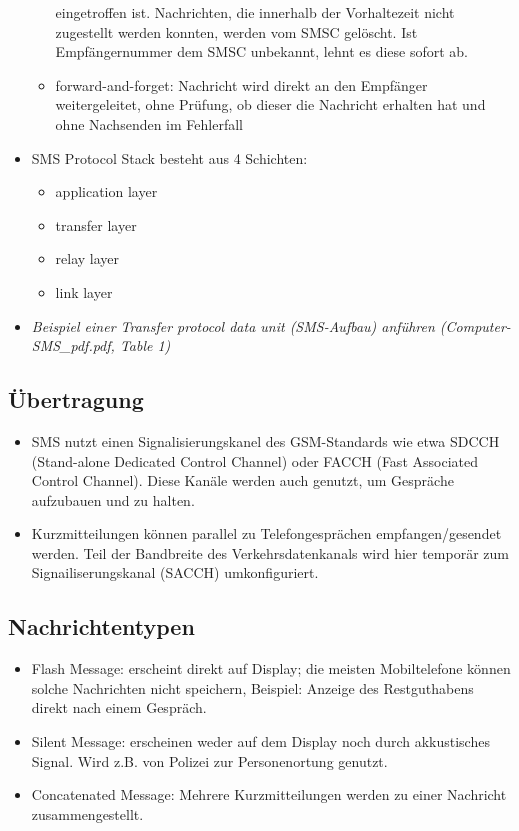 \documentclass[german,12pt,a4paper]{article}
\begin{document}
\begin{itemize}
\begin{itemize}
				eingetroffen ist. Nachrichten, die innerhalb der Vorhaltezeit nicht zugestellt werden 
				konnten, werden vom SMSC gelöscht. Ist Empfängernummer dem SMSC unbekannt, lehnt es diese sofort ab.
			\item forward-and-forget: Nachricht wird direkt an den Empfänger weitergeleitet, ohne Prüfung, ob 
				dieser die Nachricht erhalten hat und ohne Nachsenden im Fehlerfall
		\end{itemize}	
	\item SMS Protocol Stack besteht aus 4 Schichten:
		\begin{itemize}
			\item application layer
			\item transfer layer
			\item relay layer
			\item link layer
		\end{itemize}		
	\item \textit{Beispiel einer Transfer protocol data unit (SMS-Aufbau) anführen (Computer-SMS\_pdf.pdf, Table 1)}
\end{itemize}

\subsection{Übertragung}
\begin{itemize}
	\item SMS nutzt einen Signalisierungskanel des GSM-Standards wie etwa SDCCH (Stand-alone Dedicated Control Channel) 
		oder FACCH (Fast Associated Control Channel). Diese Kanäle werden auch genutzt, um Gespräche aufzubauen und zu 
		halten.
	\item Kurzmitteilungen können parallel zu Telefongesprächen empfangen/gesendet werden. Teil der Bandbreite des 
		Verkehrsdatenkanals wird hier temporär zum Signailiserungskanal (SACCH) umkonfiguriert.
\end{itemize}

\subsection{Nachrichtentypen}
\begin{itemize}
	\item Flash Message: erscheint direkt auf Display; die meisten Mobiltelefone können solche Nachrichten nicht speichern,
		Beispiel: Anzeige des Restguthabens direkt nach einem Gespräch.
	\item Silent Message: erscheinen weder auf dem Display noch durch akkustisches Signal. 
		Wird z.B. von Polizei zur Personenortung genutzt.
	\item Concatenated Message: Mehrere Kurzmitteilungen werden zu einer Nachricht zusammengestellt.
\end{itemize}
\end{document}
